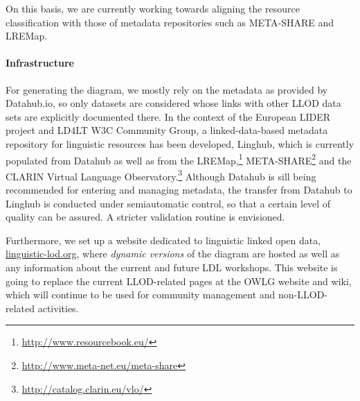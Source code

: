 On this basis, we are currently working towards aligning the resource classification with those of metadata repositories such as META-SHARE and LREMap.

\paragraph{Infrastructure}
For generating the diagram, we mostly rely on the metadata as provided by Datahub.io, so only datasets are considered whose links with other LLOD data sets are explicitly documented there.
In the context of the European LIDER project and LD4LT W3C Community Group, a linked-data-based metadata repository for linguistic resources has been developed, Linghub, which is currently populated from Datahub as well as from the LREMap,\footnote{\url{http://www.resourcebook.eu/}} META-SHARE\footnote{\url{http://www.meta-net.eu/meta-share}} and the CLARIN Virtual Language Observatory.\footnote{
	\url{http://catalog.clarin.eu/vlo/}
}
Although Datahub is sill being recommended for entering and managing metadata, the transfer from Datahub to Linghub is conducted under semiautomatic control, so that a certain level of quality can be assured. A stricter validation routine is envisioned. %

Furthermore, we set up a website dedicated to linguistic linked open data, \url{linguistic-lod.org}, where \emph{dynamic versions} of the diagram are hosted as well as any information about the current and future LDL workshops. This website is going to replace the current LLOD-related pages at the OWLG website and wiki, which will continue to be used for community management and non-LLOD-related activities.

